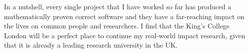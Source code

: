 \documentclass[11pt,a4paper,roman]{moderncv}
\begin{document}
In a nutshell, every single project that I have worked so far has produced a mathematically 
proven correct software and they have a far-reaching impact on the lives on common people and 
researchers. I find that the 
King's College London will be a perfect place to continue my real-world impact 
research, given that it is already a leading research university in the UK. 




\vspace{0.5cm}


\makeletterclosing
\end{document}
